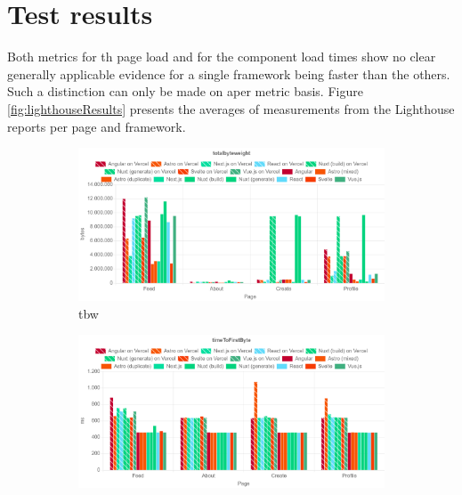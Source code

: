\documentclass[a4paper, 12pt]{article}
\begin{document}
\section{Test results}

Both metrics for th page load and for the component load times show no clear generally applicable evidence for a single framework being faster than the others.
Such a distinction can only be made on aper metric basis.
Figure \ref{fig:lighthouseResults} presents the averages of measurements from the Lighthouse reports per page and framework.

\begin{figure}[!h]
  \centering
  \begin{subfigure}{0.49\linewidth}
    \begin{center}
      \includegraphics[width=\linewidth, keepaspectratio]{img/lighthouse-results/TBW.png}
    \end{center}
    \caption{\acrfull{tbw}}\label{subfig:LH:totalbyteweight}
  \end{subfigure}
  \begin{subfigure}{0.49\linewidth}
    \begin{center}
      \includegraphics[width=\linewidth, keepaspectratio]{img/lighthouse-results/TTFB.png}

\end{center}
\end{subfigure}
\end{figure}
\end{document}
